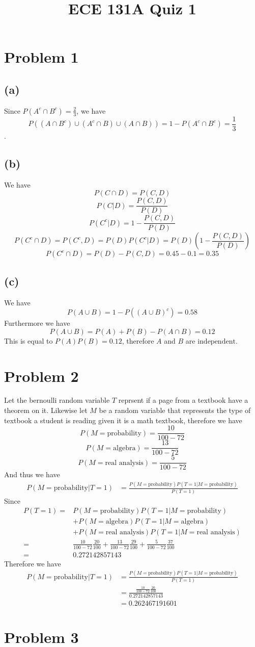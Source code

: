 
\title{ECE 131A Quiz 1}

\maketitle
\section*{Problem 1}
\subsection*{(a)}
Since $P(A^c\cap B^c)=\frac{2}{3}$, we have 
$$P((A\cap B^c)\cup (A^c\cap B)\cup (A\cap B))=1-P(A^c\cap B^c)=\boxed{\frac{1}{3}}$$.
\subsection*{(b)}
We have
$$P(C\cap D )=P(C,D)$$
$$P(C|D)=\frac{P(C,D)}{P(D)}$$
$$P(C^c|D)=1-\frac{P(C,D)}{P(D)}$$
$$P(C^c\cap D )=P(C^c,D)=P(D)P(C^c|D)=P(D)(1-\frac{P(C,D)}{P(D)})$$
$$P(C^c\cap D )=P(D)-P(C,D)=0.45-0.1=\boxed{0.35}$$
\subsection*{(c)}
We have
$$P(A\cup B)=1-P\left((A\cup B)^c\right)=0.58$$
Furthermore we have 
$$P(A\cup B)=P(A)+P(B)-P(A\cap B)=0.12$$
This is equal to $P(A)P(B)=0.12$, therefore $A$ and $B$ are $\boxed{\text{independent}}$.

\section*{Problem 2}
Let the bernoulli random variable $T$ reprsent if a page from a 
textbook have a theorem on it. Likewise let $M$ be a  random variable that represents the type of 
textbook a student is reading given it is a math textbook, therefore we have
$$P(M=\text{probability})=\frac{10}{100-72}$$
$$P(M=\text{algebra})=\frac{13}{100-72}$$
$$P(M=\text{real analysis})=\frac{5}{100-72}$$
And thus we have
\begin{align*}
P(M=\text{probability}|T=1)&=\frac{P(M=\text{probability})P(T=1|M=\text{probability})}{P(T=1)}
\end{align*}
Since
\begin{align*}
    P(T=1)=&P(M=\text{probability})P(T=1|M=\text{probability})
\\&+P(M=\text{algebra})P(T=1|M=\text{algebra})\\&+
P(M=\text{real analysis})P(T=1|M=\text{real analysis})\\
=&\frac{10}{100-72}\frac{20}{100}+\frac{13}{100-72}\frac{29}{100}+\frac{5}{100-72}\frac{37}{100}\\
=&0.272142857143
\end{align*}
Therefore we have
\begin{align*}
    P(M=\text{probability}|T=1)&=\frac{P(M=\text{probability})P(T=1|M=\text{probability})}{P(T=1)}\\
    &=\frac{\frac{10}{100-72}\frac{20}{100}}{0.272142857143}\\
    &=\boxed{0.262467191601}
\end{align*}
\section*{Problem 3}
